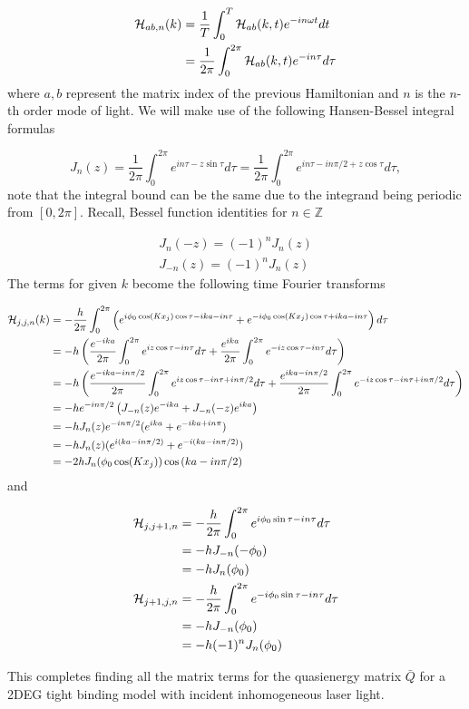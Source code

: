 \begin{align}
  \mathcal{H}_{ab,n}(k) &= \dfrac{1}{T} \int_0^T \mathcal{H}_{ab}(k,t) e^{-in \omega t} dt \\
  &= \dfrac{1}{2\pi} \int_0^{2\pi} \mathcal{H}_{ab}(k,t) e^{-in\tau} d\tau
\end{align}
where $a,b$ represent the matrix index of the previous Hamiltonian and $n$ is the $n$-th order mode of light.
We will make use of the following Hansen-Bessel integral formulas

\begin{equation} \label{eq: hansen-bessel}
  J_n(z) = \dfrac{1}{2\pi} \int_0^{2\pi} e^{in\tau - z \sin\tau} d\tau = \dfrac{1}{2\pi} \int_0^{2\pi} e^{in\tau - in\pi/2 + z\cos\tau} d\tau,
\end{equation}
note that the integral bound can be the same due to the integrand being periodic from $[0,2\pi]$.
Recall, Bessel function identities for $n \in \mathbb{Z}$

\begin{align}
  J_n(-z) = (-1)^n J_n(z) \\
  J_{-n}(z) = (-1)^n J_n(z)
\end{align}
The terms for given $k$ become the following time Fourier transforms

\begin{align}
  \mathcal{H}_{j,j,n}(k) &= -\dfrac{h}{2\pi} \int_0^{2\pi} \left( e^{i \phi_0 \cos(Kx_j) \cos \tau - ika - in\tau} + e^{-i \phi_0 \cos(Kx_j) \cos \tau + ika - in\tau} \right) d\tau \nonumber \\
    &= -h \left( \dfrac{e^{-ika}}{2\pi} \int_0^{2\pi} e^{i z \cos \tau - in\tau} d\tau + \dfrac{e^{ika}}{2\pi} \int_0^{2\pi} e^{-i z \cos \tau - in\tau} d\tau \right) \nonumber \\
    &= -h \left( \dfrac{e^{-ika -in\pi/2}}{2\pi} \int_0^{2\pi} e^{i z \cos \tau - in\tau + in\pi/2} d\tau + \dfrac{e^{ika - in\pi/2}}{2\pi} \int_0^{2\pi} e^{-i z \cos \tau - in\tau + in\pi/2} d\tau \right) \nonumber \\
    &= -h e^{-in\pi/2} \left( J_{-n}(z) e^{-ika} + J_{-n}(-z) e^{ika} \right) \nonumber \\
    &= -h J_n(z) e^{-in\pi/2} ( e^{ika} +  e^{-ika+in\pi} ) \nonumber \\
    &= -h J_n(z) ( e^{i(ka-in\pi/2)} +  e^{-i(ka-in\pi/2)} ) \nonumber \\
    &= -2h J_n(\phi_0 \cos(Kx_j)) \cos \left( ka -in\pi/2 \right)
\end{align}
and

\begin{align}
  \mathcal{H}_{j,j+1,n} &= -\dfrac{h}{2\pi} \int_0^{2\pi} e^{i \phi_0 \sin \tau - in\tau} d\tau \nonumber \\
  &= -h J_{-n}(-\phi_0) \nonumber \\
  &= -h J_n(\phi_0) \\
  \mathcal{H}_{j+1,j,n} &= -\dfrac{h}{2\pi} \int_0^{2\pi} e^{-i \phi_0 \sin \tau - in\tau} d\tau \nonumber \\
    &= -h J_{-n}(\phi_0) \nonumber \\
    &= -h (-1)^n J_n(\phi_0)
\end{align}

This completes finding all the matrix terms for the quasienergy matrix $\bar{Q}$ for a 2DEG tight binding model with incident inhomogeneous laser light.



